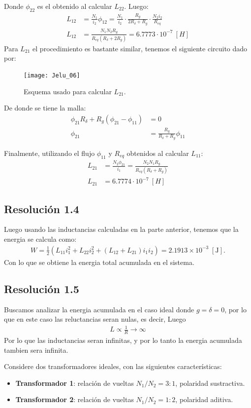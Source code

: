 \documentclass[
  11pt,
  letterpaper,
   addpoints,
  ]{exam}
\begin{document}
\begin{questions}
\begin{solution}
Donde $\phi_{22}$ es el obtenido al calcular $L_{22}$. Luego:
\begin{align}
    L_{12} &= \frac{N_1}{i_2} \phi_{12} = \frac{N_1}{i_2} \cdot \frac{R_g}{2R_\delta + R_g} \cdot \frac{N_2 i_2}{R_{eq}} \\
    L_{12} &= \frac{N_1 N_2 R_g}{R_{eq}(R_\delta + 2R_g)} = 6.7773 \cdot 10^{-7}~[H]
\end{align}
Para $L_21$ el procedimiento es bastante similar, tenemos el siguiente circuito dado por:
\begin{figure}[H]
    \centering
    \texttt{[image: Jelu\_06]}
    \caption{Esquema usado para calcular \(L_{21}\).}
\end{figure}
De donde se tiene la malla:
\begin{align}
    \phi_{21} R_\delta + R_g (\phi_{21} - \phi_{11}) &= 0 \\
    \phi_{21} &= \frac{R_g}{R_\delta + R_g} \phi_{11}
\end{align}

Finalmente, utilizando el flujo $\phi_{11}$ y $R_{eq}$ obtenidos al calcular $L_{11}$:
\begin{align}
    L_{21} &= \frac{N_2 \phi_{21}}{i_1} = \frac{N_2 N_1 R_g}{R_{eq}(R_\delta + R_g)} \\
    L_{21} &= 6.7774 \cdot 10^{-7}~[H]
\end{align}
\subsection*{Resolución 1.4}
Luego usando las inductancias calculadas en la parte anterior, tenemos que la energia se calcula como:
\begin{align}
    W= \frac{1}{2}\left(L_{11}i_1^2 + L_{22}i_2^2 + (L_{12}+L_{21})i_1 i_2\right)
    = 2.1913\times10^{-3}\;[\text{J}].
\end{align}
Con lo que se obtiene la energia total acumulada en el sistema.
\subsection*{Resolución 1.5}
Buscamos analizar la energia acumulada en el caso ideal donde $g=\delta=0$, por lo que en este caso las reluctancias seran nulas, es decir, Luego
\begin{align}
  L \propto \frac{1}{R} \to \infty
\end{align}
Por lo que las inductancias seran infinitas, y por lo tanto la energia acumulada tambien sera infinita.
\end{solution}
\newpage
\question Considere dos transformadores ideales, con las siguientes características:
\begin{itemize}
  \item \textbf{Transformador 1}: relación de vueltas \(N_1/N_2 = 3:1\), polaridad sustractiva.
  \item \textbf{Transformador 2}: relación de vueltas \(N_1/N_2 = 1:2\), polaridad aditiva.
\end{itemize}


\end{questions}
\end{document}
